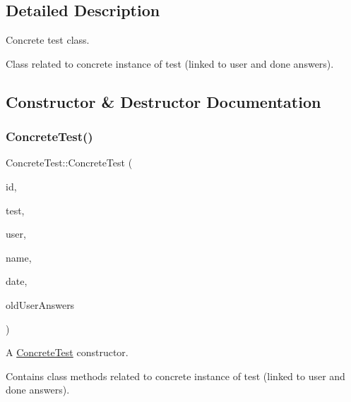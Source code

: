 \subsection{Detailed Description}
Concrete test class. 

Class related to concrete instance of test (linked to user and done answers). 

\subsection{Constructor \& Destructor Documentation}
\mbox{\label{class_concrete_test_a2604f3d0a17c6673b906d8e89f9ddbd6}} 
\subsubsection{\texorpdfstring{Concrete\+Test()}{ConcreteTest()}}
{\footnotesize\ttfamily Concrete\+Test\+::\+Concrete\+Test (\begin{DoxyParamCaption}\item[{unsigned int}]{id,  }\item[{std\+::shared\+\_\+ptr$<$ \hyperlink{class_test}{Test} $>$}]{test,  }\item[{std\+::shared\+\_\+ptr$<$ \hyperlink{class_user}{User} $>$}]{user,  }\item[{Q\+String}]{name,  }\item[{Q\+Date\+Time}]{date,  }\item[{std\+::vector$<$ std\+::shared\+\_\+ptr$<$ \hyperlink{class_old_user_answer}{Old\+User\+Answer} $>$$>$}]{old\+User\+Answers }\end{DoxyParamCaption})}



A \hyperlink{class_concrete_test}{Concrete\+Test} constructor. 

Contains class methods related to concrete instance of test (linked to user and done answers).


